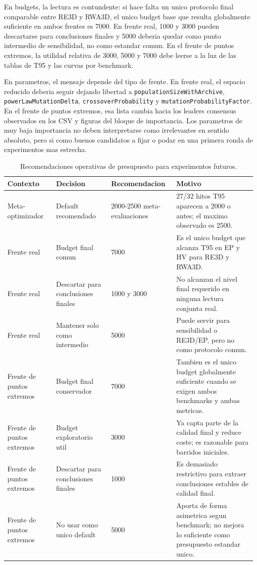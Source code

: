 \documentclass[11pt,a4paper]{article}
\begin{document}
En budgets, la lectura es contundente: si hace falta un unico protocolo final comparable entre RE3D y RWA3D, el unico budget base que resulta globalmente suficiente en ambos frentes es 7000. En frente real, 1000 y 3000 pueden descartarse para conclusiones finales y 5000 deberia quedar como punto intermedio de sensibilidad, no como estandar comun. En el frente de puntos extremos, la utilidad relativa de 3000, 5000 y 7000 debe leerse a la luz de las tablas de T95 y las curvas por benchmark.

En parametros, el mensaje depende del tipo de frente. En frente real, el espacio reducido deberia seguir dejando libertad a \texttt{populationSizeWithArchive}, \texttt{powerLawMutationDelta}, \texttt{crossoverProbability} y \texttt{mutationProbabilityFactor}. En el frente de puntos extremos, esa lista cambia hacia los leaders consensus observados en los CSV y figuras del bloque de importancia. Los parametros de muy baja importancia no deben interpretarse como irrelevantes en sentido absoluto, pero si como buenos candidatos a fijar o podar en una primera ronda de experimentos mas estrecha.

{\scriptsize
\begin{table}[p]
\centering
\caption{Recomendaciones operativas de presupuesto para experimentos futuros.}
\label{tab:budget_recommendations}
\begin{tabular}{llll}
\toprule
Contexto & Decision & Recomendacion & Motivo \\
\midrule
Meta-optimizador & Default recomendado & 2000-2500 meta-evaluaciones & 27/32 hitos T95 aparecen a 2000 o antes; el maximo observado es 2500. \\
Frente real & Budget final comun & 7000 & Es el unico budget que alcanza T95 en EP y HV para RE3D y RWA3D. \\
Frente real & Descartar para conclusiones finales & 1000 y 3000 & No alcanzan el nivel final requerido en ninguna lectura conjunta real. \\
Frente real & Mantener solo como intermedio & 5000 & Puede servir para sensibilidad o RE3D/EP, pero no como protocolo comun. \\
Frente de puntos extremos & Budget final conservador & 7000 & Tambien es el unico budget globalmente suficiente cuando se exigen ambos benchmarks y ambas metricas. \\
Frente de puntos extremos & Budget exploratorio util & 3000 & Ya capta parte de la calidad final y reduce coste; es razonable para barridos iniciales. \\
Frente de puntos extremos & Descartar para conclusiones finales & 1000 & Es demasiado restrictivo para extraer conclusiones estables de calidad final. \\
Frente de puntos extremos & No usar como unico default & 5000 & Aporta de forma asimetrica segun benchmark; no mejora lo suficiente como presupuesto estandar unico. \\
\bottomrule
\end{tabular}
\end{table}

}
\end{document}
